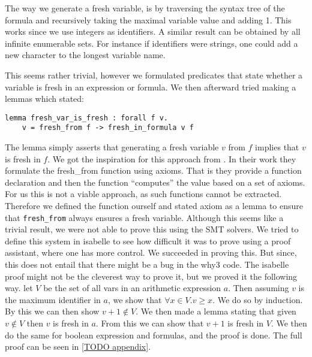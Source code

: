 The way we generate a fresh variable, is by traversing the syntax tree of the formula and recursively taking the maximal variable value and adding 1.
This works since we use integers as identifiers.
A similar result can be obtained by all infinite enumerable sets. For instance if identifiers were strings, one could add a new character to the longest variable name.

This seems rather trivial, however we formulated predicates that state whether a variable is fresh in an expression or formula. We then afterward tried making a lemmas which stated:

\begin{lstlisting}
lemma fresh_var_is_fresh : forall f v.
    v = fresh_from f -> fresh_in_formula v f
\end{lstlisting}

The lemma simply asserts that generating a fresh variable $v$ from $f$ implies that $v$ is fresh in $f$.
We got the inspiration for this approach from \cite{TODO: WP revisited}.
In their work they formulate the fresh_from function using axioms.
That is they provide a function declaration and then the function ``computes'' the value based on a set of axioms.
For us this is not a viable approach, as such functions cannot be extracted. Therefore we defined the function ourself and stated axiom as a lemma to ensure that \texttt{fresh\_from} always ensures a fresh variable.
Although this seems like a trivial result, we were not able to prove this using the SMT solvers.
We tried to define this system in isabelle to see how difficult it was to prove using a proof assistant, where one has more control. We succeeded in proving this.
But since, this does not entail that there might be a bug in the why3 code.
The isabelle proof might not be the cleverest way to prove it, but we proved it the following way.
let $V$ be the set of all vars in an arithmetic expression $a$.
Then assuming $v$ is the maximum identifier in $a$, we show that $\forall x \in V. v \ge x$. We do so by induction.
By this we can then show $v + 1 \notin V$.
We then made a lemma stating that given $v \notin V$ then $v$ is fresh in $a$.
From this we can show that $v + 1$ is fresh in $V$.
We then do the same for boolean expression and formulas, and the proof is done.
The full proof can be seen in \autoref{TODO appendix}.
